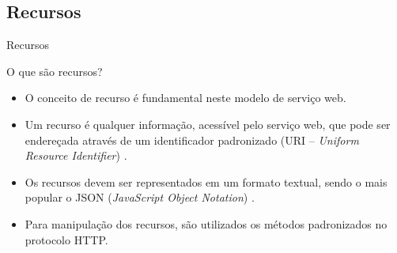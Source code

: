\documentclass{beamer}
\begin{document}
\subsection{Recursos}
\begin{frame}{Recursos}
    \begin{exampleblock}{O que são recursos?}    	           \begin{itemize}
	    \item O conceito de recurso é fundamental neste modelo de serviço web. 
	    \item Um recurso é qualquer informação, acessível pelo serviço web, que pode ser endereçada através de um identificador padronizado (URI – \textit{Uniform Resource Identifier}) \cite{tanembaum2007sd}. 
	    \item Os recursos devem ser representados em um formato textual, sendo o mais popular o JSON (\textit{JavaScript Object Notation}) \cite{nodejs2022api}. 
	    \item Para manipulação dos recursos, são utilizados os métodos padronizados no protocolo HTTP. 
	\end{itemize}
    \end{exampleblock}
\end{frame}

\end{document}
